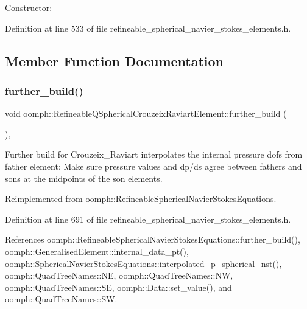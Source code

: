 Constructor\+: 



Definition at line 533 of file refineable\+\_\+spherical\+\_\+navier\+\_\+stokes\+\_\+elements.\+h.



\subsection{Member Function Documentation}
\mbox{\label{classoomph_1_1RefineableQSphericalCrouzeixRaviartElement_a6a67cbea725615b74a5f3a92aa60ebd2}} 
\subsubsection{\texorpdfstring{further\+\_\+build()}{further\_build()}}
{\footnotesize\ttfamily void oomph\+::\+Refineable\+Q\+Spherical\+Crouzeix\+Raviart\+Element\+::further\+\_\+build (\begin{DoxyParamCaption}{ }\end{DoxyParamCaption})\hspace{0.3cm}{\ttfamily [inline]}, {\ttfamily [virtual]}}

Further build for Crouzeix\+\_\+\+Raviart interpolates the internal pressure dofs from father element\+: Make sure pressure values and dp/ds agree between fathers and sons at the midpoints of the son elements. 

Reimplemented from \hyperlink{classoomph_1_1RefineableSphericalNavierStokesEquations_acb7ba9bdf812cecd8d1d503000227856}{oomph\+::\+Refineable\+Spherical\+Navier\+Stokes\+Equations}.



Definition at line 691 of file refineable\+\_\+spherical\+\_\+navier\+\_\+stokes\+\_\+elements.\+h.



References oomph\+::\+Refineable\+Spherical\+Navier\+Stokes\+Equations\+::further\+\_\+build(), oomph\+::\+Generalised\+Element\+::internal\+\_\+data\+\_\+pt(), oomph\+::\+Spherical\+Navier\+Stokes\+Equations\+::interpolated\+\_\+p\+\_\+spherical\+\_\+nst(), oomph\+::\+Quad\+Tree\+Names\+::\+NE, oomph\+::\+Quad\+Tree\+Names\+::\+NW, oomph\+::\+Quad\+Tree\+Names\+::\+SE, oomph\+::\+Data\+::set\+\_\+value(), and oomph\+::\+Quad\+Tree\+Names\+::\+SW.

